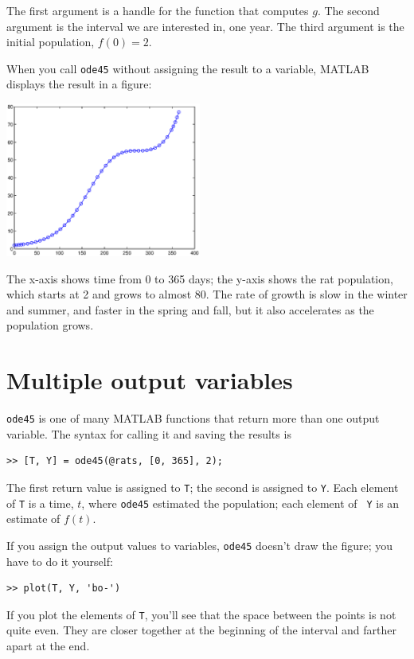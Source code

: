 \documentclass[
]{book}
\begin{document}
The first argument is a handle for the function that
computes $g$.  The second argument is the interval we are interested
in, one year.  The third argument is the initial population, $f(0) = 2$.

When you call {\tt ode45} without assigning the result to a variable,
MATLAB displays the result in a figure:

\beforefig \centerline{\includegraphics[height=2in]{figs/rats.eps}}

The x-axis shows time from 0 to 365 days; the y-axis shows the rat
population, which starts at 2 and grows to almost 80.  The rate
of growth is slow in the winter and summer, and faster in the
spring and fall, but it also accelerates as the population grows.


\section{Multiple output variables}
\label{sect:rats}

{\tt ode45} is one of many MATLAB functions that return more
than one output variable.  The syntax for calling it and saving
the results is

\begin{verbatim}
>> [T, Y] = ode45(@rats, [0, 365], 2);
\end{verbatim}

The first return value is assigned to {\tt T}; the second is assigned
to {\tt Y}.  Each element of {\tt T} is a time,
$t$, where {\tt ode45} estimated the population; each element of {\tt
Y} is an estimate of $f(t)$.

If you assign the output values to variables,
{\tt ode45} doesn't draw the figure;
you have to do it yourself:

\begin{verbatim}
>> plot(T, Y, 'bo-')
\end{verbatim}

If you plot the elements of {\tt T}, you'll see that the
space between the points is not quite even.  They are closer
together at the beginning of the interval and farther apart at the end.
\end{document}
